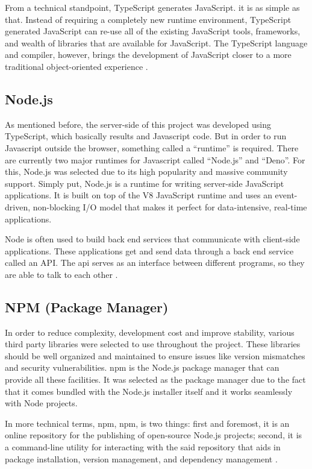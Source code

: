 \documentclass[12pt]{report}
\begin{document}
From a technical standpoint, TypeScript generates JavaScript. it is as simple as that. Instead of requiring a completely new runtime environment, TypeScript generated JavaScript can re-use all of the existing JavaScript tools, frameworks, and wealth of libraries that are available for JavaScript. The TypeScript language and compiler, however, brings the development of JavaScript closer to a more traditional object-oriented experience \cite{rozentals_2015_typescript}.

\subsection{Node.js}
As mentioned before, the server-side of this project was developed using TypeScript, which basically results and Javascript code. But in order to run Javascript outside the browser, something called a ``runtime'' is required. There are currently two major runtimes for Javascript called ``Node.js'' and ``Deno''. For this, Node.js was selected due to its high popularity and massive community support. Simply put, Node.js is a runtime for writing server-side JavaScript applications. It is built on top of the V8 JavaScript runtime and uses an event-driven, non-blocking I/O model that makes it perfect for data-intensive, real-time applications.

Node is often used to build back end services that communicate with client-side applications. These applications get and send data through a back end service called an API. The \acrshort{api} serves as an interface between different programs, so they are able to talk to each other \cite{teixeira_2013_nodejs}.

\subsection{NPM (Package Manager)}
In order to reduce complexity, development cost and improve stability, various third party libraries were selected to use throughout the project. These libraries should be well organized and maintained to ensure issues like version mismatches and security vulnerabilities. \acrshort{npm} is the Node.js package manager that can provide all these facilities. It was selected as the package manager due to the fact that it comes bundled with the Node.js installer itself and it works seamlessly with Node projects.

In more technical terms, \acrshort{npm}, \acrlong{npm}, is two things: first and foremost, it is an online repository for the publishing of open-source Node.js projects; second, it is a command-line utility for interacting with the said repository that aids in package installation, version management, and dependency management \cite{teixeira_2013_nodejs}.
\end{document}

